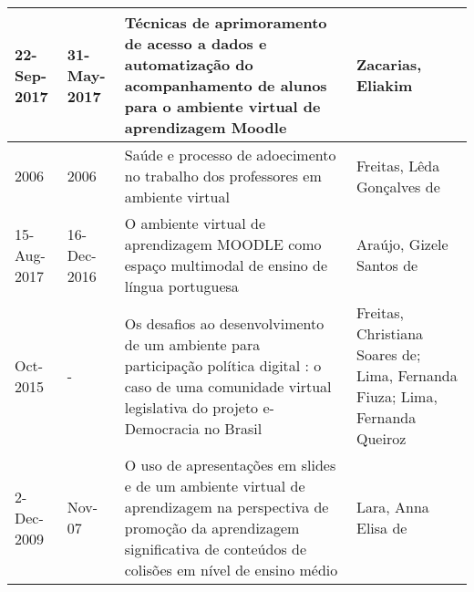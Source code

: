 \begin{table}
{\begin{tabular}{|m{1.3cm}|m{1.3cm}|p{7cm}|p{6cm}|}
22-Sep-2017 & 31-May-2017 & Técnicas de aprimoramento de acesso a dados e automatização do acompanhamento de alunos para o ambiente virtual de aprendizagem Moodle                                                                                & Zacarias, Eliakim                                                                                                                                                                                                                                            \\ \hline
2006        & 2006        & Saúde e processo de adoecimento no trabalho dos professores em ambiente virtual                                                                                                                                       & Freitas, Lêda Gonçalves de                                                                                                                                                                                                                                   \\ \hline
15-Aug-2017 & 16-Dec-2016 & O ambiente virtual de aprendizagem MOODLE como espaço multimodal de ensino de língua portuguesa                                                                                                                       & Araújo, Gizele Santos de                                                                                                                                                                                                                                     \\ \hline
Oct-2015    & -           & Os desafios ao desenvolvimento de um ambiente para participação política digital : o caso de uma comunidade virtual legislativa do projeto e-Democracia no Brasil                                                     & Freitas, Christiana Soares de; Lima, Fernanda Fiuza; Lima, Fernanda Queiroz                                                                                                                                                                                  \\ \hline
2-Dec-2009  & Nov-07      & O uso de apresentações em slides e de um ambiente virtual de aprendizagem na perspectiva de promoção da aprendizagem significativa de conteúdos de colisões em nível de ensino médio                                  & Lara, Anna Elisa de                                                                                                                                                                                                                                          \\ \hline

\end{tabular}}
\end{table}
